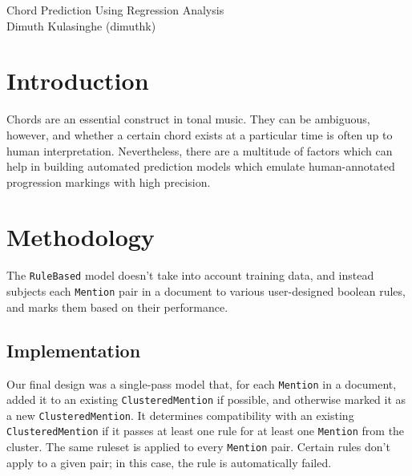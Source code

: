\documentclass[12pt]{article}
\begin{document}
\begin{center}
\begin{Large} Chord Prediction Using Regression Analysis \\ Dimuth Kulasinghe (dimuthk) \end{Large}
\end{center}


\section{Introduction}
Chords are an essential construct in tonal music. They can be ambiguous, however, and whether a certain chord exists at a particular time is often up to human interpretation. Nevertheless, there are a multitude of factors which can help in building automated prediction models which emulate human-annotated progression markings with high precision.



\section{Methodology}
The \texttt{RuleBased} model doesn't take into account training data, and instead subjects each \texttt{Mention} pair in a document to various user-designed boolean rules, and marks them based on their performance. 

\subsection{Implementation}
Our final design was a single-pass model that, for each \texttt{Mention} in a document, added it to an existing \texttt{ClusteredMention} if possible, and otherwise marked it as a new \texttt{ClusteredMention}. It determines compatibility with an existing \texttt{ClusteredMention} if it passes at least one rule for at least one \texttt{Mention} from the cluster. The same ruleset is applied to every \texttt{Mention} pair. Certain rules don't apply to a given pair; in this case, the rule is automatically failed. \\
\end{document}
